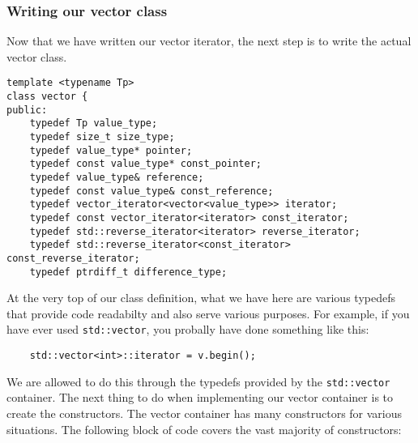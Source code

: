 \documentclass{report}
\begin{document}
\subsubsection{Writing our vector class}
Now that we have written our vector iterator, the next step is to write the actual vector class.
\begin{verbatim}
template <typename Tp>
class vector {
public:
    typedef Tp value_type;
    typedef size_t size_type;
    typedef value_type* pointer;
    typedef const value_type* const_pointer;
    typedef value_type& reference;
    typedef const value_type& const_reference;
    typedef vector_iterator<vector<value_type>> iterator;
    typedef const vector_iterator<iterator> const_iterator;
    typedef std::reverse_iterator<iterator> reverse_iterator;
    typedef std::reverse_iterator<const_iterator> const_reverse_iterator;
    typedef ptrdiff_t difference_type;
    \end{verbatim}
    At the very top of our class definition, what we have here are various typedefs that provide code readabilty and also serve various purposes. For example, if you have ever used \texttt{std::vector}, you probally have done something like this:
    \begin{verbatim}
    std::vector<int>::iterator = v.begin(); 
    \end{verbatim}
    We are allowed to do this through the typedefs provided by the \texttt{std::vector} container.
    \bigbreak \noindent
    The next thing to do when implementing our vector container is to create the constructors. The vector container has many constructors for various situations. The following block of code covers the vast majority of constructors:
\end{document}
